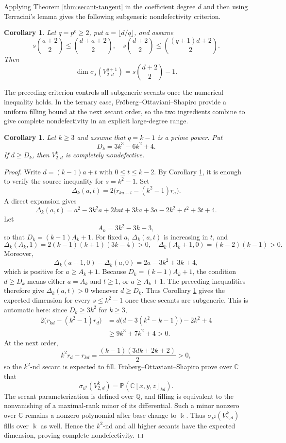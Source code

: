 \documentclass[11pt]{amsart}
\newtheorem{corollary}[theorem]{Corollary}
\theoremstyle{remark}
\newcommand{\PP}{\mathbb P}
\newcommand{\kk}{\Bbbk}
\begin{document}
Applying Theorem \ref{thm:secant-tangent} in the coefficient degree $d$ and then using Terracini's lemma gives the following subgeneric nondefectivity criterion.

\begin{corollary}\label{cor:secant-criterion}
Let $q=p^e\ge2$, put $a=\lfloor d/q\rfloor$, and assume
$$
s\binom{a+2}{2}\le\binom{d+a+2}{2},
\quad
s\binom{d+2}{2}\le\binom{(q+1)d+2}{2}.
$$
Then
$$
\dim\sigma_s(V^{q+1}_{2,d})
=
s\binom{d+2}{2}-1.
$$
\end{corollary}

The preceding criterion controls all subgeneric secants once the numerical inequality holds. In the ternary case, Fr\"oberg--Ottaviani--Shapiro \cite{FOS} provide a uniform filling bound at the next secant order, so the two ingredients combine to give complete nondefectivity in an explicit large-degree range.

\begin{corollary}\label{cor:frobenius-complete}
Let $k\ge3$ and assume that $q=k-1$ is a prime power. Put
$$
D_k=3k^3-6k^2+4.
$$
If $d\ge D_k$, then $V^k_{2,d}$ is completely nondefective.
\end{corollary}

\begin{proof}
Write $d=(k-1)a+t$ with $0\le t\le k-2$. By Corollary \ref{cor:secant-criterion}, it is enough to verify the source inequality for $s=k^2-1$. Set
$$
\Delta_k(a,t)
=
2\bigl(r_{ka+t}-(k^2-1)r_a\bigr).
$$
A direct expansion gives
$$
\Delta_k(a,t)
=
a^2-3k^2a+2kat+3ka+3a-2k^2+t^2+3t+4.
$$
Let
$$
A_k=3k^2-3k-3,
$$
so that $D_k=(k-1)A_k+1$. For fixed $a$, $\Delta_k(a,t)$ is increasing in $t$, and
$$
\Delta_k(A_k,1)=2(k-1)(k+1)(3k-4)>0,
\quad
\Delta_k(A_k+1,0)=(k-2)(k-1)>0.
$$
Moreover,
$$
\Delta_k(a+1,0)-\Delta_k(a,0)
=2a-3k^2+3k+4,
$$
which is positive for $a\ge A_k+1$. Because $D_k=(k-1)A_k+1$, the condition $d\ge D_k$ means either $a=A_k$ and $t\ge1$, or $a\ge A_k+1$. The preceding inequalities therefore give $\Delta_k(a,t)>0$ whenever $d\ge D_k$. Thus Corollary \ref{cor:secant-criterion} gives the expected dimension for every $s\le k^2-1$ once these secants are subgeneric. This is automatic here: since $D_k\ge3k^2$ for $k\ge3$,
$$
\begin{aligned}
2\bigl(r_{kd}-(k^2-1)r_d\bigr)
&=d\bigl(d-3(k^2-k-1)\bigr)-2k^2+4\\
&\ge 9k^3+7k^2+4>0.
\end{aligned}
$$
At the next order,
$$
k^2r_d-r_{kd}=\frac{(k-1)(3dk+2k+2)}2>0,
$$
so the $k^2$-nd secant is expected to fill. Fr\"oberg--Ottaviani--Shapiro \cite[Theorem~4]{FOS} prove over $\mathbb C$ that
$$
\sigma_{k^2}(V^k_{2,d})=\PP(\mathbb C[x,y,z]_{kd}).
$$
The secant parameterization is defined over $\mathbb Q$, and filling is equivalent to the nonvanishing of a maximal-rank minor of its differential. Such a minor nonzero over $\mathbb C$ remains a nonzero polynomial after base change to $\kk$. Thus $\sigma_{k^2}(V^k_{2,d})$ fills over $\kk$ as well. Hence the $k^2$-nd and all higher secants have the expected dimension, proving complete nondefectivity.
\end{proof}
\end{document}
